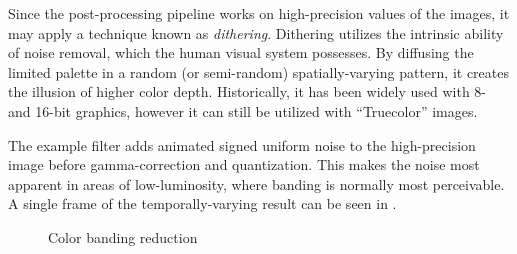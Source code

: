 Since the post-processing pipeline works on high-precision values of the images, it may apply a technique known as \emph{dithering}. Dithering utilizes the intrinsic ability of noise removal, which the human visual system possesses. By diffusing the limited palette in a random (or semi-random) spatially-varying pattern, it creates the illusion of higher color depth. Historically, it has been widely used with 8- and 16-bit graphics, however it can still be utilized with ``Truecolor'' images.

The example filter adds animated signed uniform noise to the high-precision image before gamma-correction and quantization. This makes the noise most apparent in areas of low-luminosity, where banding is normally most perceivable. A single frame of the temporally-varying result can be seen in .

\begin{figure}[ht!]
  \centering
  \caption[Color banding reduction]{Color banding reduction}
  \label{fig:postProcBandingNoBanding}
\end{figure}
